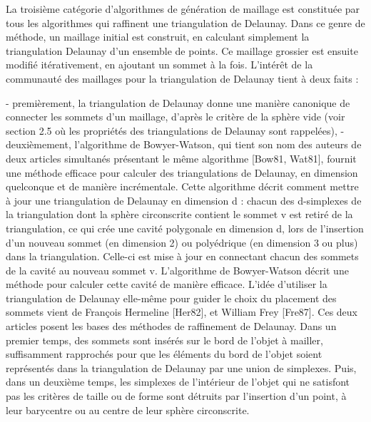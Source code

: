 {La troisième catégorie d'algorithmes de génération de maillage est constituée par tous les algorithmes qui raffinent une triangulation de Delaunay. Dans ce genre de méthode, un maillage initial est construit, en calculant simplement la triangulation Delaunay d'un ensemble de points. Ce maillage grossier est ensuite modifié itérativement, en ajoutant un sommet à la fois. L'intérêt de la communauté des maillages pour la triangulation de Delaunay tient à deux faits :
 
 - premièrement, la triangulation de Delaunay donne une manière canonique de connecter les sommets d'un maillage, d'après le critère de la sphère vide (voir section 2.5 o\`u les propriétés des triangulations de Delaunay sont rappelées),
 - deuxièmement, l'algorithme de Bowyer-Watson, qui tient son nom des auteurs de deux articles simultanés présentant le même algorithme [Bow81, Wat81], fournit une méthode efficace pour calculer des triangulations de Delaunay, en dimension quelconque et de manière incrémentale. Cette algorithme décrit comment mettre à jour une triangulation de Delaunay en dimension d : chacun des d-simplexes de la triangulation dont la sphère circonscrite contient le sommet v est retiré de la triangulation, ce qui crée une cavité polygonale en dimension d, lors de l'insertion d'un nouveau sommet (en dimension 2) ou polyédrique (en dimension 3 ou plus) dans la triangulation. Celle-ci est mise à jour en connectant chacun des sommets de la cavité au nouveau sommet v. L'algorithme de Bowyer-Watson décrit une méthode pour calculer cette cavité de manière efficace.
L'idée d'utiliser la triangulation de Delaunay elle-même pour guider le choix du placement des sommets vient de François Hermeline [Her82], et William Frey [Fre87]. Ces deux articles posent les bases des méthodes de raffinement de Delaunay. Dans un premier temps, des sommets sont insérés sur le bord de l'objet à mailler, suffisamment rapprochés pour que les éléments du bord de l'objet soient représentés dans la triangulation de Delaunay par une union de simplexes. Puis, dans un deuxième temps, les simplexes de l'intérieur de l'objet qui ne satisfont pas les critères de taille ou de forme sont détruits par l'insertion d'un point, à leur barycentre ou au centre de leur sphère circonscrite.

}
